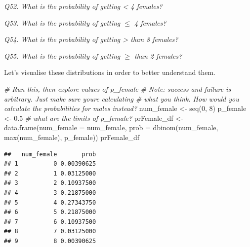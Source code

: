 \documentclass[
  11pt,
  a4paper,
]{book}
\newenvironment{Shaded}{\begin{snugshade}}{\end{snugshade}}
\newcommand{\AttributeTok}[1]{\textcolor[rgb]{0.77,0.63,0.00}{#1}}
\newcommand{\CommentTok}[1]{\textcolor[rgb]{0.56,0.35,0.01}{\textit{#1}}}
\newcommand{\DecValTok}[1]{\textcolor[rgb]{0.00,0.00,0.81}{#1}}
\newcommand{\FloatTok}[1]{\textcolor[rgb]{0.00,0.00,0.81}{#1}}
\newcommand{\FunctionTok}[1]{\textcolor[rgb]{0.00,0.00,0.00}{#1}}
\newcommand{\NormalTok}[1]{#1}
\newcommand{\OtherTok}[1]{\textcolor[rgb]{0.56,0.35,0.01}{#1}}
\newcommand{\SpecialCharTok}[1]{\textcolor[rgb]{0.00,0.00,0.00}{#1}}
\newcommand{\StringTok}[1]{\textcolor[rgb]{0.31,0.60,0.02}{#1}}
\begin{document}
\emph{Q52. What is the probability of getting \textless{} 4 females?}

\emph{Q53. What is the probability of getting \(\leq\) 4 females?}

\emph{Q54. What is the probability of getting \textgreater{} than 8 females?}

\emph{Q55. What is the probability of getting \(\geq\) than 2 females?}

Let's visualise these distributions in order to better understand them.

\begin{Shaded}
\begin{Highlighting}[]
\CommentTok{\# Run this, then explore values of p\_female}
\CommentTok{\# Note: \textquotesingle{}success\textquotesingle{} and \textquotesingle{}failure\textquotesingle{} is arbitrary. Just make sure you\textquotesingle{}re calculating}
\CommentTok{\# what you think. How would you calculate the probabilities for males instead?}
\NormalTok{num\_female }\OtherTok{\textless{}{-}} \FunctionTok{seq}\NormalTok{(}\DecValTok{0}\NormalTok{, }\DecValTok{8}\NormalTok{) }
\NormalTok{p\_female }\OtherTok{\textless{}{-}} \FloatTok{0.5} \CommentTok{\# what are the limits of p\_female?}
\NormalTok{prFemale\_df }\OtherTok{\textless{}{-}} \FunctionTok{data.frame}\NormalTok{(}\AttributeTok{num\_female =}\NormalTok{ num\_female, }
                          \AttributeTok{prob =} \FunctionTok{dbinom}\NormalTok{(num\_female, }\FunctionTok{max}\NormalTok{(num\_female), p\_female)) }
\NormalTok{prFemale\_df }
\end{Highlighting}
\end{Shaded}

\begin{verbatim}
##   num_female       prob
## 1          0 0.00390625
## 2          1 0.03125000
## 3          2 0.10937500
## 4          3 0.21875000
## 5          4 0.27343750
## 6          5 0.21875000
## 7          6 0.10937500
## 8          7 0.03125000
## 9          8 0.00390625
\end{verbatim}

\begin{Shaded}
\end{Shaded}
\end{document}

